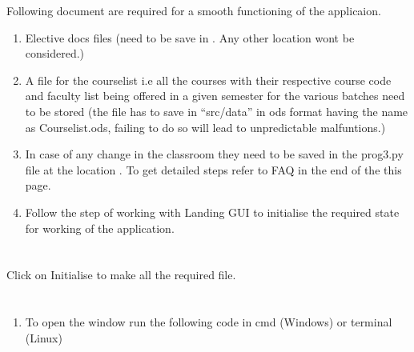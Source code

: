 \documentclass[letterpaper,10pt,english]{sphinxmanual}
\begin{document}
Following document are required for a smooth functioning of the applicaion.
\begin{enumerate}
%
\item {} 
Elective docs files (need to be save in . Any other location wont be considered.)

\item {} 
A file for the courselist i.e all the courses with their respective course code and faculty list being offered in a given semester for the various batches need to be stored (the file has to save in “src/data” in ods format having the name as Courselist.ods, failing to do so will lead to unpredictable malfuntions.)

\item {} 
In case of any change in the classroom they need to be saved in the prog3.py file at the location . To get detailed steps refer to FAQ in the end of the this page.

\item {} 
Follow the step of working with Landing GUI to initialise the required state for working of the application.

\end{enumerate}


\section{}
\label{\detokenize{user_manual:working-in-landing-gui}}

Click on Initialise to make all the required file.



\section{}
\label{\detokenize{user_manual:working-in-gui-1}}

\subsection{}
\label{\detokenize{user_manual:steps}}
\begin{enumerate}
%
\item {} 
To open the window run the following code in cmd (Windows) or terminal (Linux)

\end{enumerate}
\end{document}
